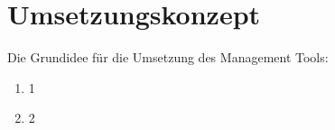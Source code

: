\section{Umsetzungskonzept}
\label{sec:umsetzung}
Die Grundidee für die Umsetzung des Management Tools:
\begin{enumerate}
	\item 1
	\item 2
\end{enumerate}



